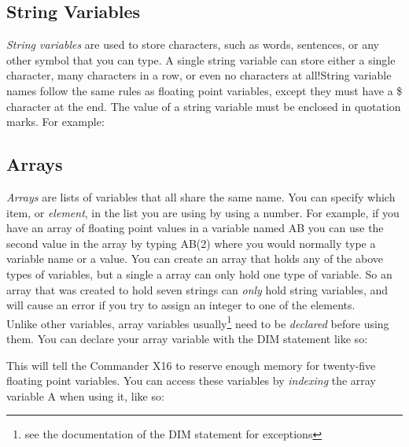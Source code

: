 \subsection{String Variables}

\emph{String variables} are used to store characters, such as words, sentences,
or any other symbol that you can type.  A single string variable can store
either a single character, many characters in a row, or even no characters at
all!String variable names follow the same rules as floating point variables,
except they must have a {\ttfamily \$} character at the end.  The value of a
string variable must be enclosed in quotation marks.  For example:\\


\subsection{Arrays}

\emph{Arrays} are lists of variables that all share the same name.  You can
specify which item, or \emph{element}, in the list you are using by using a
number.  For example, if you have an array of floating point values in a
variable named {\ttfamily AB} you can use the second value in the array by
typing {\ttfamily AB(2)} where you would normally type a variable name or a
value.  You can create an array that holds any of the above types of variables,
but a single a array can only hold one type of variable.  So an array that was
created to hold seven strings can \emph{only} hold string variables, and will
cause an error if you try to assign an integer to one of the elements.\\

Unlike other variables, array variables usually\footnote{see the documentation
of the {\ttfamily DIM} statement for exceptions} need to be \emph{declared}
before using them.  You can declare your array variable with the {\ttfamily
DIM} statement like so:\\


This will tell the Commander X16 to reserve enough memory for twenty-five
floating point variables.  You can access these variables by \emph{indexing}
the array variable {\ttfamily A} when using it, like so:\\

